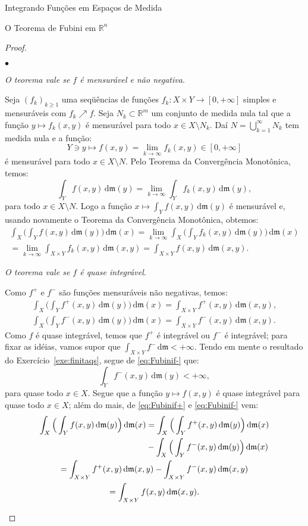 \documentclass[oneside,final,11pt]{amsbook}
\newcommand{\R}{\mathds R}
\newcommand{\leb}{\mathfrak m}
\newcommand{\dd}{\mathrm d}
\newcounter{contador}
\newenvironment{bulletindent}{\setcounter{contador}{0}
\begin{list} {$\bullet$}
{\usecounter{contador}
\setlength{\leftmargin}{10pt}
\setlength{\rightmargin}{10pt}
\setlength{\labelsep}{5pt}
\setlength{\itemsep}{10pt}
\setlength{\topsep}{10pt}}}
{\end{list}}
\theoremstyle{remark}\newtheorem{exercise}{Exercício}[chapter]
\theoremstyle{remark}\newtheorem{*exercise}[exercise]{\hbox to 0pt{\hskip 0pt minus 1fil*}Exercício}
\theoremstyle{definition}\newtheorem{exdefin}{Definição}[chapter]
\theoremstyle{plain}\newtheorem{teo}{Teorema}[section]
\theoremstyle{plain}\newtheorem{lem}[teo]{Lema}
\theoremstyle{plain}\newtheorem{prop}[teo]{Proposição}
\theoremstyle{plain}\newtheorem{cor}[teo]{Corolário}
\theoremstyle{definition}\newtheorem{defin}[teo]{Definição}
\theoremstyle{remark}\newtheorem{rem}[teo]{Observação}
\theoremstyle{definition}\newtheorem{notation}[teo]{Notação}
\theoremstyle{definition}\newtheorem{convention}[teo]{Convenção}
\theoremstyle{definition}\newtheorem{example}[teo]{Exemplo}
\numberwithin{section}{chapter}
\numberwithin{equation}{section}
\begin{document}
\begin{chapter}{Integrando Funções em Espaços de Medida}
\begin{section}[O Teorema de Fubini em $\R^n$]{O Teorema de Fubini em ${\R^n}$}
\begin{proof}
\begin{bulletindent}
\item {\em O teorema vale se $f$ é mensurável e não negativa}.

Seja $(f_k)_{k\ge1}$ uma seqüências de funções $f_k:X\times Y\to[0,+\infty]$
simples e mensuráveis com $f_k\nearrow f$. Seja $N_k\subset\R^m$ um conjunto de medida
nula tal que a função $y\mapsto f_k(x,y)$ é mensurável para todo $x\in X\setminus N_k$.
Daí $N=\bigcup_{k=1}^\infty N_k$ tem medida nula e a função:
\[Y\ni y\longmapsto f(x,y)=\lim_{k\to\infty}f_k(x,y)\in[0,+\infty]\]
é mensurável para todo $x\in X\setminus N$. Pelo Teorema da Convergência Monotônica,
temos:
\[\int_Yf(x,y)\,\dd\leb(y)=\lim_{k\to\infty}\int_Yf_k(x,y)\,\dd\leb(y),\]
para todo $x\in X\setminus N$. Logo a função $x\mapsto\int_Yf(x,y)\,\dd\leb(y)$
é mensurável e, usando novamente o Teorema da Convergência Monotônica, obtemos:
\begin{multline*}
\int_X\Big(\int_Yf(x,y)\,\dd\leb(y)\Big)\,\dd\leb(x)=\lim_{k\to\infty}
\int_X\Big(\int_Yf_k(x,y)\,\dd\leb(y)\Big)\,\dd\leb(x)\\
=\lim_{k\to\infty}\int_{X\times Y}f_k(x,y)\,\dd\leb(x,y)=\int_{X\times Y}f(x,y)\,\dd\leb(x,y).
\end{multline*}

\item {\em O teorema vale se $f$ é quase integrável}.

Como $f^+$ e $f^-$ são funções mensuráveis não negativas, temos:
\begin{gather}
\int_X\Big(\int_Yf^+(x,y)\,\dd\leb(y)\Big)\,\dd\leb(x)=\int_{X\times Y}f^+(x,y)\,\dd\leb(x,y),\label{eq:Fubinif+}\\
\int_X\Big(\int_Yf^-(x,y)\,\dd\leb(y)\Big)\,\dd\leb(x)=\int_{X\times Y}f^-(x,y)\,\dd\leb(x,y).\label{eq:Fubinif-}
\end{gather}
Como $f$ é quase integrável, temos que $f^+$ é integrável ou $f^-$ é integrável;
para fixar as idéias, vamos supor que $\int_{X\times Y}f^-\,\dd\leb<+\infty$.
Tendo em mente o resultado do Exercício~\ref{exe:finitaqs}, segue de \eqref{eq:Fubinif-} que:
\[\int_Yf^-(x,y)\,\dd\leb(y)<+\infty,\]
para quase todo $x\in X$. Segue que a função $y\mapsto f(x,y)$ é quase integrável
para quase todo $x\in X$; além do mais, de \eqref{eq:Fubinif+} e \eqref{eq:Fubinif-} vem:
\begin{multline*}
\begin{aligned}\int_X\Big(\int_Yf(x,y)\,\dd\leb(y)\Big)\,\dd\leb(x)&=
\int_X\Big(\int_Yf^+(x,y)\,\dd\leb(y)\Big)\,\dd\leb(x)\\
&-\int_X\Big(\int_Yf^-(x,y)\,\dd\leb(y)\Big)\,\dd\leb(x)
\end{aligned}\\
=\int_{X\times Y}f^+(x,y)\,\dd\leb(x,y)-\int_{X\times Y}f^-(x,y)\,\dd\leb(x,y)\\
=\int_{X\times Y}f(x,y)\,\dd\leb(x,y).\qedhere
\end{multline*}
\end{bulletindent}
\end{proof}


\end{section}
\end{chapter}
\end{document}
